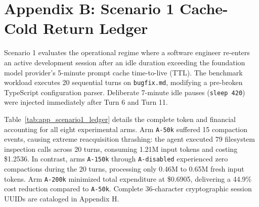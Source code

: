 \documentclass[10pt,twocolumn,a4paper]{article}
\begin{document}
\clearpage
\section*{Appendix B: Scenario 1 Cache-Cold Return Ledger}

Scenario 1 evaluates the operational regime where a software engineer re-enters an active development session after an idle duration exceeding the foundation model provider's 5-minute prompt cache time-to-live (TTL). The benchmark workload executes 20 sequential turns on \texttt{bugfix.md}, modifying a pre-broken TypeScript configuration parser. Deliberate 7-minute idle pauses (\texttt{sleep 420}) were injected immediately after Turn 6 and Turn 11.

Table~\ref{tab:app_scenario1_ledger} details the complete token and financial accounting for all eight experimental arms. Arm \texttt{A-50k} suffered 15 compaction events, causing extreme reacquisition thrashing: the agent executed 79 filesystem inspection calls across 20 turns, consuming 1.21M input tokens and costing \$1.2536. In contrast, arms \texttt{A-150k} through \texttt{A-disabled} experienced zero compactions during the 20 turns, processing only 0.46M to 0.65M fresh input tokens. Arm \texttt{A-200k} minimized total expenditure at \$0.6905, delivering a 44.9\% cost reduction compared to \texttt{A-50k}. Complete 36-character cryptographic session UUIDs are cataloged in Appendix H.
\end{document}
